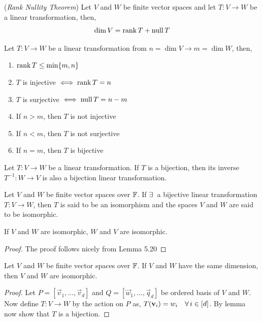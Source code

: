 \documentclass{article}
\begin{document}
\begin{nthm}{(\textit{Rank Nullity Theorem})}
  Let $V$ and $W$ be finite vector spaces and let $T : V \to W$ be a linear transformation, then,
  $$ \dim V = \operatorname{rank} T + \operatorname{null} T $$
\end{nthm}

\begin{ncor}{}
  Let $T: V \to W$ be a linear transformation from $n = \dim V \to m = \dim W$, then,
  \begin{enumerate}
    \item $\operatorname{rank} T \le \min\{m, n\}$
    \item $T$ is injective $\iff \operatorname{rank} T = n$
    \item $T$ is surjective $\iff \operatorname{null} T = n -m$
    \item If $n> m$, then $T$ is not injective
    \item If $n < m$, then $T$ is not surjective
    \item If $n =m$, then $T$ is bijective
  \end{enumerate}
\end{ncor}

\begin{nlemma}
  Let $T : V \to W$ be a linear transformation. If $T$ is a bijection, then its inverse $T^{-1}: W\to V$ is also a bijection linear transformation.
\end{nlemma}

\begin{ndefi}
  Let $V$ and $W$ be finite vector spaces over $\mathbb{F}$. If $\exists\,$ a bijective linear transformation $T : V \to W$, then $T$ is said to be an isomorphism and the spaces $V$ and $W$ are said to be isomorphic.
\end{ndefi}

\begin{ncor}
  If $V$ and $W$ are isomorphic, $W$ and $V$ are isomorphic.
\end{ncor}

\begin{proof}
  The proof follows nicely from Lemma 5.20
\end{proof}

\begin{nthm}
  Let $V$ and $W$ be finite vector spaces over $\mathbb{F}$. If $V$ and $W$ have the same dimension, then $V$ and $W$ are isomorphic.
\end{nthm}

\begin{proof}
  Let $P = [\vec v_1, \dots, \vec v_d]$ and $Q = [\vec w_1, \dots, \vec q_d]$ be ordered basis of $V$ and $W$. Now define $T: V \to W$ by the action on $P$ as, $T(\boldsymbol{\mathbf{v}}_i) = w_i \quad \forall\, i\in [d]$. By lemma now show that $T$ is a bijection.
\end{proof}
\end{document}
